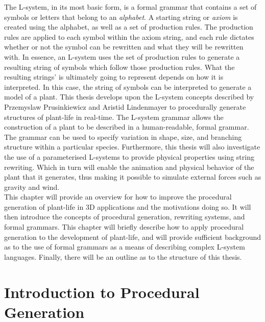 The L-system, in its most basic form, is a formal grammar that contains a set of symbols or letters that belong to an \textit{alphabet}. A starting string or \textit{axiom} is created using the alphabet, as well as a set of production rules. The production rules are applied to each symbol within the axiom string, and each rule dictates whether or not the symbol can be rewritten and what they will be rewritten with. In essence, an L-system uses the set of production rules to generate a resulting string of symbols which follow those production rules. What the resulting strings' is ultimately going to represent depends on how it is interpreted. In this case, the string of symbols can be interpreted to generate a model of a plant. This thesis develops upon the L-system concepts described by Przemyslaw Prusinkiewicz and Aristid Lindenmayer to procedurally generate structures of plant-life in real-time. The L-system grammar allows the construction of a plant to be described in a human-readable, formal grammar. The grammar can be used to specify variation in shape, size, and branching structure within a particular species. Furthermore, this thesis will also investigate the use of a parameterised L-systems to provide physical properties using string rewriting. Which in turn will enable the animation and physical behavior of the plant that it generates, thus making it possible to simulate external forces such as gravity and wind. \\

This chapter will provide an overview for how to improve the procedural generation of plant-life in 3D applications and the motivations doing so. It will then introduce the concepts of procedural generation, rewriting systems, and formal grammars. This chapter will briefly describe how to apply procedural generation to the development of plant-life, and will provide sufficient background as to the use of formal grammars as a means of describing complex L-system languages. Finally, there will be an outline as to the structure of this thesis.

\section{Introduction to Procedural Generation}

